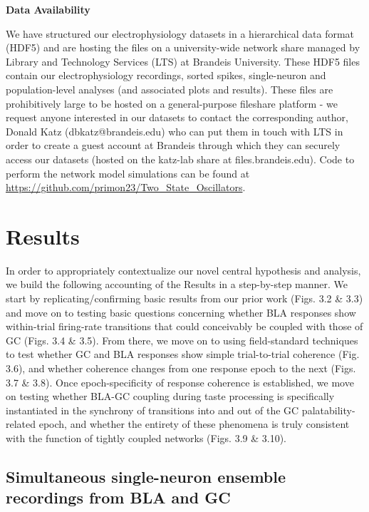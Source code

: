 \begin{refsection}
\smallskip
\noindent\textbf{Data Availability}\par
\noindent We have structured our electrophysiology datasets in a hierarchical data format (HDF5) and are hosting the files on a university-wide network share managed by Library and Technology Services (LTS) at Brandeis University. These HDF5 files contain our electrophysiology recordings, sorted spikes, single-neuron and population-level analyses (and associated plots and results). These files are prohibitively large to be hosted on a general-purpose fileshare platform - we request anyone interested in our datasets to contact the corresponding author, Donald Katz (dbkatz@brandeis.edu) who can put them in touch with LTS in order to create a guest account at Brandeis through which they can securely access our datasets (hosted on the katz-lab share at files.brandeis.edu). Code to perform the network model simulations can be found at \url{https://github.com/primon23/Two_State_Oscillators}.

\section{Results}
In order to appropriately contextualize our novel central hypothesis and analysis, we build the following accounting of the Results in a step-by-step manner. We start by replicating/confirming basic results from our prior work (Figs. 3.2 \& 3.3) and move on to testing basic questions concerning whether BLA responses show within-trial firing-rate transitions that could conceivably be coupled with those of GC (Figs. 3.4 \& 3.5). From there, we move on to using field-standard techniques to test whether GC and BLA responses show simple trial-to-trial coherence (Fig. 3.6), and whether coherence changes from one response epoch to the next (Figs. 3.7 \& 3.8). Once epoch-specificity of response coherence is established, we move on testing whether BLA-GC coupling during taste processing is specifically instantiated in the synchrony of transitions into and out of the GC palatability-related epoch, and whether the entirety of these phenomena is truly consistent with the function of tightly coupled networks (Figs. 3.9 \& 3.10).

\subsection{Simultaneous single-neuron ensemble recordings from BLA and GC}


\end{refsection}
